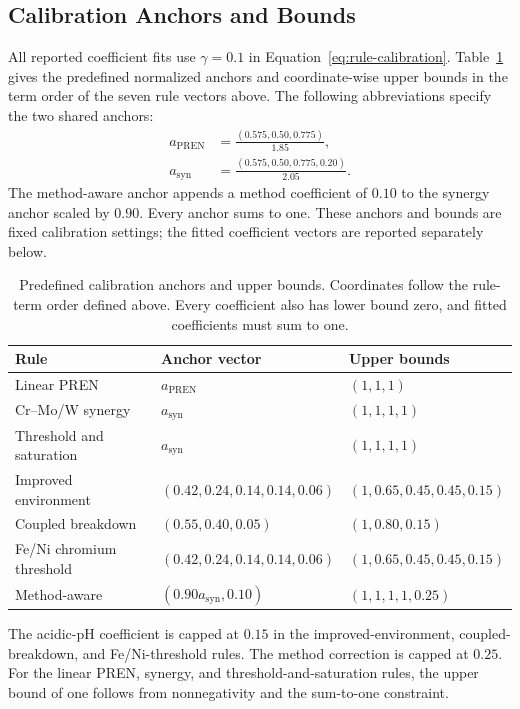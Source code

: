 \documentclass{article}
\begin{document}
\subsection{Calibration Anchors and Bounds}

All reported coefficient fits use \(\gamma=0.1\) in
Equation~\eqref{eq:rule-calibration}. Table~\ref{tab:calibration-settings}
gives the predefined normalized anchors and coordinate-wise upper bounds in
the term order of the seven rule vectors above. The following abbreviations
specify the two shared anchors:
\begin{align*}
a_{\mathrm{PREN}}&=\frac{(0.575,0.50,0.775)}{1.85},\\
a_{\mathrm{syn}}&=\frac{(0.575,0.50,0.775,0.20)}{2.05}.
\end{align*}
The method-aware anchor appends a method coefficient of \(0.10\) to the
synergy anchor scaled by \(0.90\). Every anchor sums to one. These anchors
and bounds are fixed calibration settings; the fitted coefficient vectors
are reported separately below.

\begin{table}[htbp]
\centering
\caption{Predefined calibration anchors and upper bounds. Coordinates follow
the rule-term order defined above. Every coefficient also has lower bound
zero, and fitted coefficients must sum to one.}
\label{tab:calibration-settings}
\begin{tabular}{@{}lll@{}}
\toprule
Rule & Anchor vector & Upper bounds \\
\midrule
Linear PREN & \(a_{\mathrm{PREN}}\) & \((1,1,1)\) \\
Cr--Mo/W synergy & \(a_{\mathrm{syn}}\) & \((1,1,1,1)\) \\
Threshold and saturation & \(a_{\mathrm{syn}}\) & \((1,1,1,1)\) \\
Improved environment & \((0.42,0.24,0.14,0.14,0.06)\)
& \((1,0.65,0.45,0.45,0.15)\) \\
Coupled breakdown & \((0.55,0.40,0.05)\) & \((1,0.80,0.15)\) \\
Fe/Ni chromium threshold & \((0.42,0.24,0.14,0.14,0.06)\)
& \((1,0.65,0.45,0.45,0.15)\) \\
Method-aware & \((0.90a_{\mathrm{syn}},0.10)\) & \((1,1,1,1,0.25)\) \\
\bottomrule
\end{tabular}
\end{table}

The acidic-pH coefficient is capped at \(0.15\) in the improved-environment,
coupled-breakdown, and Fe/Ni-threshold rules. The method correction is capped
at \(0.25\). For the linear PREN, synergy, and threshold-and-saturation
rules, the upper bound of one follows from nonnegativity and the
sum-to-one constraint.
\end{document}
